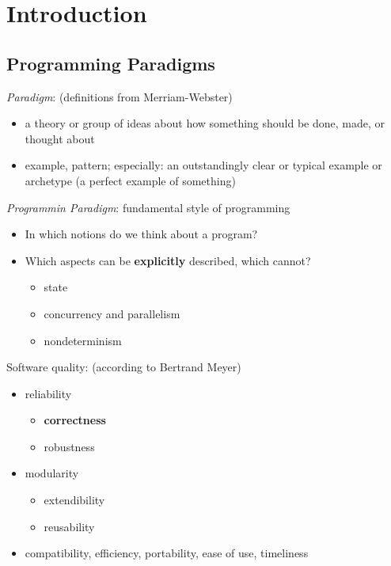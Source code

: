 \section{Introduction}
\begin{multicols}{2}
\subsection{Programming Paradigms}
\textit{Paradigm}: (definitions from Merriam-Webster)
\begin{itemize}
  \item a theory or group of ideas about how something should be done, made, or thought about
  \item example, pattern; especially: an outstandingly clear or typical example or archetype (a perfect example of something)
\end{itemize}
\textit{Programmin Paradigm}: fundamental style of programming
\begin{itemize}
  \item In which notions do we think about a program?
  \item Which aspects can be \textbf{explicitly} described, which cannot?
  \begin{itemize}
    \item state
    \item concurrency and parallelism
    \item nondeterminism
  \end{itemize}
\end{itemize}

Software quality: (according to Bertrand Meyer)
\begin{itemize}
  \item reliability
  \begin{itemize}
    \item \textbf{correctness}
    \item robustness
  \end{itemize}
  \item modularity
  \begin{itemize}
    \item extendibility
    \item reusability
  \end{itemize}
  \item compatibility, efficiency, portability, ease of use, timeliness
\end{itemize}


\end{multicols}
